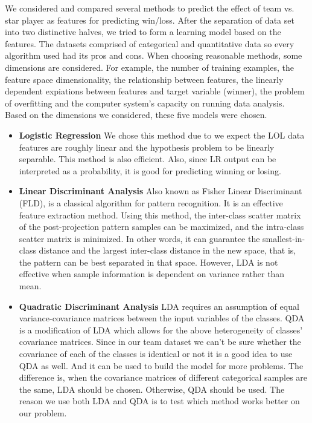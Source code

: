 \documentclass[conference]{IEEEtran}
\begin{document}
We considered and compared several methods to predict the effect of team vs. star player as features for predicting win/loss. 
After the separation of data set into two distinctive halves, we tried to form a learning model based on the features. The datasets comprised of categorical and quantitative data so every algorithm used had its pros and cons. When choosing reasonable methods, some dimensions are considered. For example, the number of training examples, the feature space dimensionality, the relationship between features, the linearly dependent expiations between features and target variable (winner), the problem of overfitting and the computer system’s capacity on running data analysis. Based on the dimensions we considered, these five models were chosen.

\begin{itemize}
  \item \textbf{Logistic Regression}
We chose this method due to we expect the LOL data features are roughly linear and the hypothesis problem to be linearly separable. This method is also efficient. Also, since LR output can be interpreted as a probability, it is good for predicting winning or losing. 

  \item \textbf{Linear Discriminant Analysis }
Also known as Fisher Linear Discriminant (FLD), is a classical algorithm for pattern recognition. It is an effective feature extraction method. Using this method, the inter-class scatter matrix of the post-projection pattern samples can be maximized, and the intra-class scatter matrix is minimized. In other words, it can guarantee the smallest-in-class distance and the largest inter-class distance in the new space, that is, the pattern can be best separated in that space. However, LDA is not effective when sample information is dependent on variance rather than mean.

  \item \textbf{Quadratic Discriminant Analysis }
LDA requires an assumption of equal variance-covariance matrices between the input variables of the classes. QDA is a modification of LDA which allows for the above heterogeneity of classes' covariance matrices. Since in our team dataset we can't be sure whether the covariance of each of the classes is identical or not it is a good idea to use QDA as well. And it can be used to build the model for more problems. The difference is, when the covariance matrices of different categorical samples are the same, LDA should be chosen. Otherwise, QDA should be used. The reason we use both LDA and QDA is to test which method works better on our problem.


\end{itemize}
\end{document}
